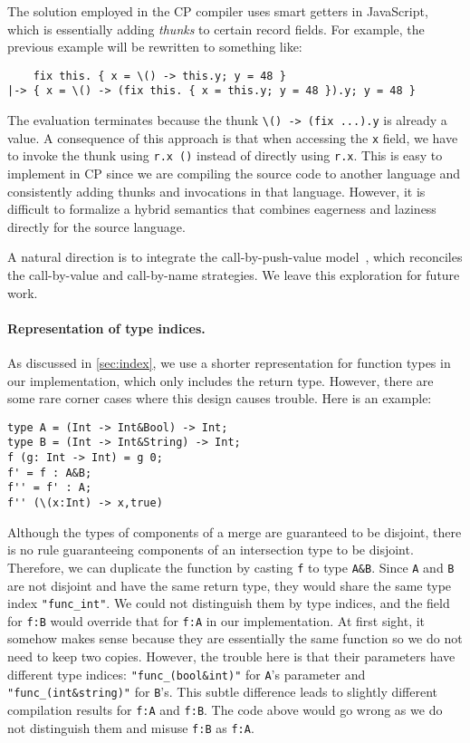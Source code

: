 The solution employed in the CP compiler uses smart getters in JavaScript, which
is essentially adding \emph{thunks} to certain record fields. For example, the
previous example will be rewritten to something like:
\begin{lstlisting}
    fix this. { x = \() -> this.y; y = 48 }
|-> { x = \() -> (fix this. { x = this.y; y = 48 }).y; y = 48 }
\end{lstlisting}
The evaluation terminates because the thunk \lstinline{\() -> (fix ...).y} is
already a value. A consequence of this approach is that when accessing the
\lstinline{x} field, we have to invoke the thunk using \lstinline{r.x ()}
instead of directly using \lstinline{r.x}. This is easy to implement in CP since
we are compiling the source code to another language and consistently adding
thunks and invocations in that language. However, it is difficult to formalize a
hybrid semantics that combines eagerness and laziness directly for the source
language.

A natural direction is to integrate the call-by-push-value
model~\citep{levy2012call}, which reconciles the call-by-value and call-by-name
strategies. We leave this exploration for future work.

\paragraph{Representation of type indices.}
As discussed in \autoref{sec:index}, we use a shorter representation for
function types in our implementation, which only includes the return type.
However, there are some rare corner cases where this design causes trouble. Here
is an example:
\begin{lstlisting}
type A = (Int -> Int&Bool) -> Int;
type B = (Int -> Int&String) -> Int;
f (g: Int -> Int) = g 0;
f' = f : A&B;
f'' = f' : A;
f'' (\(x:Int) -> x,true)
\end{lstlisting}
Although the types of components of a merge are guaranteed to be disjoint, there
is no rule guaranteeing components of an intersection type to be disjoint.
Therefore, we can duplicate the function by casting \lstinline{f} to type
\lstinline{A&B}. Since \lstinline{A} and \lstinline{B} are not disjoint and have
the same return type, they would share the same type index
\lstinline{"func_int"}. We could not distinguish them by type indices, and the
field for \lstinline{f:B} would override that for \lstinline{f:A} in our
implementation. At first sight, it somehow makes sense because they are
essentially the same function so we do not need to keep two copies. However, the
trouble here is that their parameters have different type indices:
\lstinline{"func_(bool&int)"} for \lstinline{A}'s parameter and
\lstinline{"func_(int&string)"} for \lstinline{B}'s. This subtle difference
leads to slightly different compilation results for \lstinline{f:A} and
\lstinline{f:B}. The code above would go wrong as we do not distinguish them and
misuse \lstinline{f:B} as \lstinline{f:A}.


